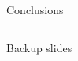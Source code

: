 \documentclass[10pt,aspectratio=169,usenames,dvipsnames]{beamer}
\begin{document}
\begin{frame}{Conclusions}
\begin{columns}[T]
\begin{column}{0.125\textwidth}
        \end{column}
    \end{columns}
\end{frame}

\begin{frame}

\end{frame}

\appendix
\begin{frame}[standout]
	Backup slides
\end{frame}
\end{document}
